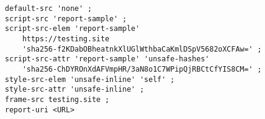 \begin{verbatim}
default-src 'none' ; 
script-src 'report-sample' ; 
script-src-elem 'report-sample' 
	https://testing.site 
	'sha256-f2KDabOBheatnkXlUGlWthbaCaKmlDSpV5682oXCFAw=' ; 
script-src-attr 'report-sample' 'unsafe-hashes' 
	'sha256-ChDYROnXdAFVmpHR/3aN8o1C7WPipQjRBCtCfYIS8CM=' ; 
style-src-elem 'unsafe-inline' 'self' ; 
style-src-attr 'unsafe-inline' ; 
frame-src testing.site ; 
report-uri <URL>
\end{verbatim}

